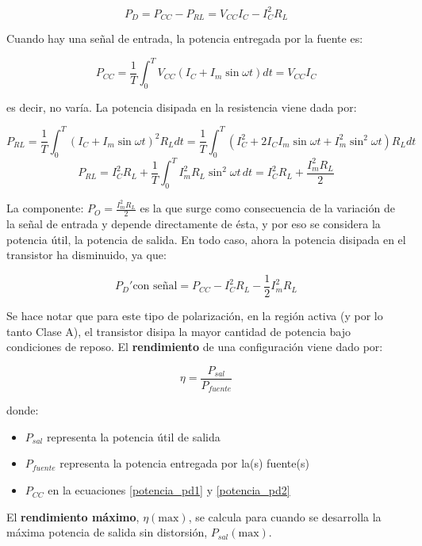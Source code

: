 \begin{equation} \label{potencia_pd1}
	P_D = P_{CC} - P_{RL} = V_{CC} I_C - I_C^2 R_L
\end{equation}

Cuando hay una señal de entrada, la potencia entregada por la fuente es:

\[
P_{CC} = \frac{1}{T} \int_0^T V_{CC} (I_C + I_m \sin \omega t) dt = V_{CC} I_C
\]

es decir, no varía. La potencia disipada en la resistencia viene dada por:

\[
P_{RL} = \frac{1}{T} \int_0^T (I_C + I_m \sin \omega t)^2 R_L dt = \frac{1}{T} \int_0^T (I_C^2 + 2 I_C I_m \sin \omega t + I_m^2 \sin^2 \omega t) R_L dt
\]
\[
P_{RL} = I_C^2 R_L + \frac{1}{T} \int_0^T I_m^2 R_L \sin^2 \omega t \, dt = I_C^2 R_L + \frac{I_m^2 R_L}{2}
\]

La componente: \( P_O = \frac{I_m^2 R_L}{2} \) es la que surge como consecuencia de la variación de la señal de entrada y depende directamente de ésta, y por eso se considera la potencia útil, la potencia de salida. 
En todo caso, ahora la potencia disipada en el transistor ha disminuido, ya que:

\begin{equation} \label{potencia_pd2}
	P_{D}' \text{con señal} = P_{CC} - I_C^2 R_L - \frac{1}{2} I_m^2 R_L
\end{equation}

Se hace notar que para este tipo de polarización, en la región activa (y por lo tanto Clase A), el transistor disipa la mayor cantidad de potencia bajo condiciones de reposo.	El \textbf{rendimiento} de una configuración viene dado por:

\begin{equation}
	\eta = \frac{P_{sal}}{P_{fuente}}
\end{equation}

donde:

\begin{itemize}
	\item \(P_{sal}\) representa la potencia útil de salida
	\item \(P_{fuente}\) representa la potencia entregada por la(s) fuente(s)
	\item \(P_{CC}\) en la ecuaciones \ref{potencia_pd1} y \ref{potencia_pd2}
\end{itemize}

El \textbf{rendimiento máximo}, \(\eta(\text{max})\), se calcula para cuando se desarrolla la máxima potencia de salida sin distorsión, \(P_{sal}(\text{max})\).

